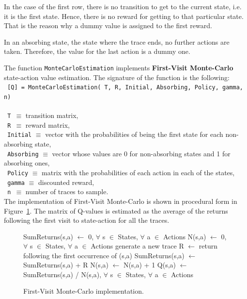 \documentclass[11pt]{article}   	%
\begin{document}
In the case of the first row, there is no transition to get to the current state, i.e. it is the first state. Hence, there is no reward for getting to that particular state. That is the reason why a dummy value is assigned to the first reward.

In an absorbing state, the state where the trace ends, no further actions are taken. Therefore, the value for the last action is a dummy one.

The function \texttt{MonteCarloEstimation} implements \textbf{First-Visit Monte-Carlo} state-action value estimation. The signature of the function is the following:\\

\noindent\texttt{ [Q] = MonteCarloEstimation( T, R,  Initial, Absorbing, Policy, gamma, n)} \\
\\
\texttt{ T }$\equiv$ transition matrix,\\
\texttt{ R }$\equiv$ reward matrix,\\
\texttt{ Initial} $\equiv$ vector with the probabilities of being the first state for each non-absorbing state,\\
\texttt{ Absorbing} $\equiv$ vector whose values are 0 for non-absorbing states and 1 for absorbing ones,\\
\texttt{ Policy} $\equiv$ matrix with the probabilities of each action in each of the states,\\
\texttt{ gamma} $\equiv$ discounted reward,\\
\texttt{ n }$\equiv$ number of traces to sample.\\

The implementation of First-Visit Monte-Carlo is shown in procedural form in Figure~\ref{fig:mcfv}. The matrix of Q-values is estimated as the average of the returns following the first visit to state-action for all the traces.
\begin{figure}[!ht]
\begin{framed}
\begin{algorithmic}
 	\STATE SumReturns(s,a) $\leftarrow$ 0, $\forall$ s $\in$ States, $\forall$ a $\in$ Actions\;
 	\STATE N(s,a) $\leftarrow$ 0, $\forall$ s $\in$ States, $\forall$ a $\in$ Actions\;
  		\STATE generate a new trace\;
   			\STATE R $\leftarrow$ return following the first occurrence of (s,a)\;
   			\STATE SumReturns(s,a) $\leftarrow$ SumReturns(s,a) + R\;
   			\STATE N(s,a) $\leftarrow$ N(s,a) + 1\;
  		\ENDIF
 	 \ENDFOR
 \STATE Q(s,a) $\leftarrow$ SumReturns(s,a) / N(s,a), $\forall$ s $\in$ States, $\forall$ a $\in$ Actions\;
\end{algorithmic}
\end{framed}
 \caption{First-Visit Monte-Carlo implementation.\label{fig:mcfv}}
 \end{figure}
 
\end{document}
